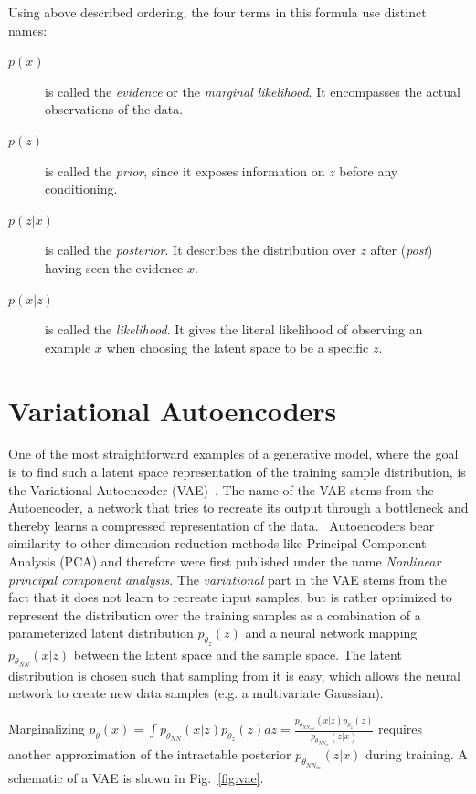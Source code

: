 Using above described ordering, the four terms in this formula use distinct names:
\begin{description}
    \item[$p(x)$] is called the \textit{evidence} or the \textit{marginal likelihood}. It encompasses the actual observations of the data.
    \item[] \item[$p(z)$] is called the \textit{prior}, since it exposes information on $z$ before any conditioning.
    \item[$p(z|x)$] is called the \textit{posterior}. It describes the distribution over $z$ after (\textit{post}) having seen the evidence $x$.
    \item[$p(x|z)$] is called the \textit{likelihood}. It gives the literal likelihood of observing an example $x$ when choosing the latent space to be a specific $z$.
\end{description}

\section{Variational Autoencoders}
One of the most straightforward examples of a generative model, where the goal is to find such a latent space representation of the training sample distribution, is the Variational Autoencoder (VAE)~\autocite{kingma2022autoencoding}. The name of the VAE stems from the Autoencoder, a network that tries to recreate its output through a bottleneck and thereby learns a compressed representation of the data.~\autocite{https://doi.org/10.1002/aic.690370209} Autoencoders bear similarity to other dimension reduction methods like Principal Component Analysis (PCA) and therefore were first published under the name \textit{Nonlinear principal component analysis}. The \textit{variational} part in the VAE stems from the fact that it does not learn to recreate input samples, but is rather optimized to represent the distribution over the training samples as a combination of a parameterized latent distribution $p_{\theta_z}(z)$ and a neural network mapping $p_{\theta_{NN}}(x|z)$ between the latent space and the sample space. The latent distribution is chosen such that sampling from it is easy, which allows the neural network to create new data samples (e.g. a multivariate Gaussian).

Marginalizing $p_\theta(x) = \int p_{\theta_{NN}}(x|z) p_{\theta_z}(z) dz = \frac{p_{\theta_{NN_{out}}}(x|z) p_{\theta_z}(z)}{p_{\theta_{NN_{in}}}(z|x)}$ requires another approximation of the intractable posterior $p_{\theta_{NN_{in}}}(z|x)$ during training. A schematic of a VAE is shown in Fig.~\ref{fig:vae}.

